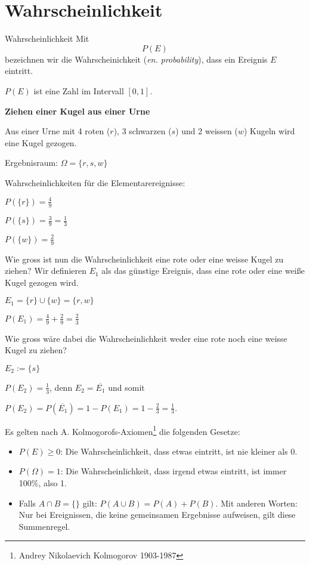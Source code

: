 
\section{Wahrscheinlichkeit}
\begin{definition}{Wahrscheinlichkeit}{}
Mit $$P(E)$$ bezeichnen wir die Wahrscheinichkeit (\textit{en. probability}), dass ein Ereignis $E$ eintritt.

$P(E)$ ist eine Zahl im Intervall $[0,1]$.
\end{definition}

\begin{beispiel}{}{}\textbf{Ziehen einer Kugel aus einer Urne}

Aus einer Urne mit 4 roten ($r$), 3 schwarzen ($s$) und 2 weissen ($w$) Kugeln wird eine Kugel gezogen.

Ergebnisraum: $\Omega = \{r, s, w\}$



Wahrscheinlichkeiten für die Elementarereignisse:

$P(\{r\}) = \frac49$

$P(\{s\}) = \frac39 = \frac13$

$P(\{w\}) = \frac29$

Wie gross ist nun die Wahrscheinlichkeit eine rote oder eine weisse Kugel zu ziehen?
Wir definieren $E_1$ als das günstige Ereignis, dass eine rote oder eine weiße Kugel gezogen wird.

$E_1 = \{r\} \cup \{w\} = \{r,w\}$

$P(E_1) = \frac49 + \frac29 = \frac23$



Wie gross wäre dabei die Wahrscheinlichkeit weder eine rote noch eine weisse Kugel zu ziehen?

$E_2 := \{s\}$

$P(E_2) = \frac13$, denn $E_2 = \overline{E_1}$ und somit

$P(E_2) = P(\overline{E_1}) = 1 - P(E_1) = 1 - \frac23 = \frac13$.

\end{beispiel}
\newpage


Es gelten nach A. Kolmogorofs-Axiomen\footnote{Andrey Nikolaevich
  Kolmogorov 1903-1987} die folgenden Gesetze:

\begin{gesetz}{}{}
\begin{itemize}
\item $P(E) \ge 0$: Die Wahrscheinlichkeit, dass etwas eintritt, ist nie kleiner als 0.
\item $P(\Omega) = 1$: Die Wahrscheinlichkeit, dass irgend etwas eintritt, ist immer 100\%, also 1.
\item Falls $A \cap B = \{\}$ gilt: $P(A\cup B) = P(A) + P(B)$. Mit anderen Worten: Nur bei Ereignissen, die keine gemeinsamen Ergebnisse aufweisen, gilt diese Summenregel.
\end{itemize}
\end{gesetz}

